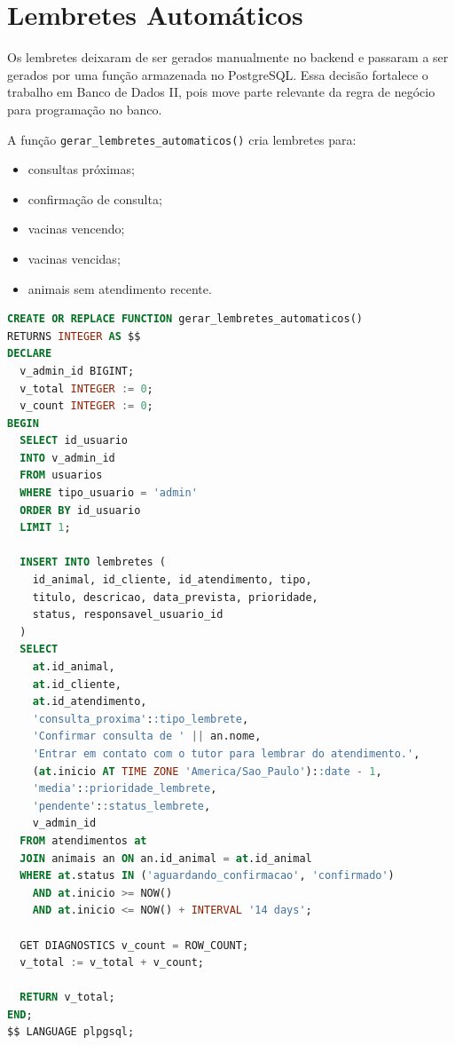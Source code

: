 \documentclass[12pt,a4paper]{article}
\begin{document}
\section{Lembretes Automáticos}

Os lembretes deixaram de ser gerados manualmente no backend e passaram a ser gerados por uma função armazenada no PostgreSQL. Essa decisão fortalece o trabalho em Banco de Dados II, pois move parte relevante da regra de negócio para programação no banco.

A função \texttt{gerar\_lembretes\_automaticos()} cria lembretes para:

\begin{itemize}[leftmargin=*]
  \item consultas próximas;
  \item confirmação de consulta;
  \item vacinas vencendo;
  \item vacinas vencidas;
  \item animais sem atendimento recente.
\end{itemize}

\begin{lstlisting}[style=codigo,language=SQL,caption={Função armazenada que gera lembretes automáticos}]
CREATE OR REPLACE FUNCTION gerar_lembretes_automaticos()
RETURNS INTEGER AS $$
DECLARE
  v_admin_id BIGINT;
  v_total INTEGER := 0;
  v_count INTEGER := 0;
BEGIN
  SELECT id_usuario
  INTO v_admin_id
  FROM usuarios
  WHERE tipo_usuario = 'admin'
  ORDER BY id_usuario
  LIMIT 1;

  INSERT INTO lembretes (
    id_animal, id_cliente, id_atendimento, tipo,
    titulo, descricao, data_prevista, prioridade,
    status, responsavel_usuario_id
  )
  SELECT
    at.id_animal,
    at.id_cliente,
    at.id_atendimento,
    'consulta_proxima'::tipo_lembrete,
    'Confirmar consulta de ' || an.nome,
    'Entrar em contato com o tutor para lembrar do atendimento.',
    (at.inicio AT TIME ZONE 'America/Sao_Paulo')::date - 1,
    'media'::prioridade_lembrete,
    'pendente'::status_lembrete,
    v_admin_id
  FROM atendimentos at
  JOIN animais an ON an.id_animal = at.id_animal
  WHERE at.status IN ('aguardando_confirmacao', 'confirmado')
    AND at.inicio >= NOW()
    AND at.inicio <= NOW() + INTERVAL '14 days';

  GET DIAGNOSTICS v_count = ROW_COUNT;
  v_total := v_total + v_count;

  RETURN v_total;
END;
$$ LANGUAGE plpgsql;
\end{lstlisting}
\end{document}
